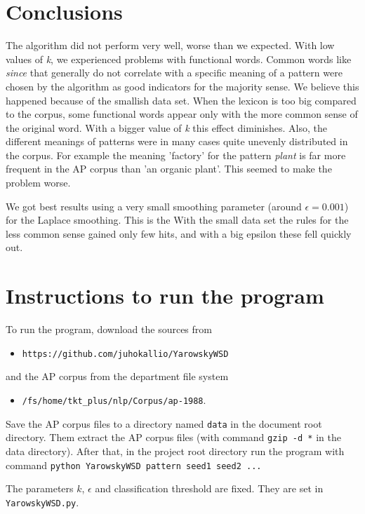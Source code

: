 \documentclass[finnish]{article}
\begin{document}
\section{Conclusions}
The algorithm did not perform very well, worse than we expected. With low values of \emph{k}, we experienced problems with functional words. Common words like \emph{since} that generally do not correlate with a specific meaning of a pattern were chosen by the algorithm as good indicators for the majority sense. We believe this happened because of the smallish data set. When the lexicon is too big compared to the corpus, some functional words appear only with the more common sense of the original word. With a bigger value of \emph{k} this effect diminishes. Also, the different meanings of patterns were in many cases quite unevenly distributed in the corpus. For example the meaning 'factory' for the pattern \emph{plant} is far more frequent in the AP corpus than 'an organic plant'. This seemed to make the problem worse.

We got best results using a very small smoothing parameter (around $\epsilon = 0.001$) for the Laplace smoothing. This is the  With the small data set the rules for the less common sense gained only few hits, and with a big epsilon these fell quickly out.

\section{Instructions to run the program}
To run the program, download the sources from
\begin{itemize}
\item \texttt{https://github.com/juhokallio/YarowskyWSD}
\end{itemize}
\noindent and the AP corpus from the department file system
\begin{itemize}
\item \texttt{/fs/home/tkt\_plus/nlp/Corpus/ap-1988}.
\end{itemize}
Save the AP corpus files to a directory named \texttt{data} in the document root directory. Them extract the AP corpus files (with command \texttt{gzip -d *} in the data directory). After that, in the project root directory run the program with command \texttt{python YarowskyWSD pattern seed1 seed2 ...}

The parameters $k$, $\epsilon$ and classification threshold are fixed. They are set in \texttt{YarowskyWSD.py}.
\end{document}
